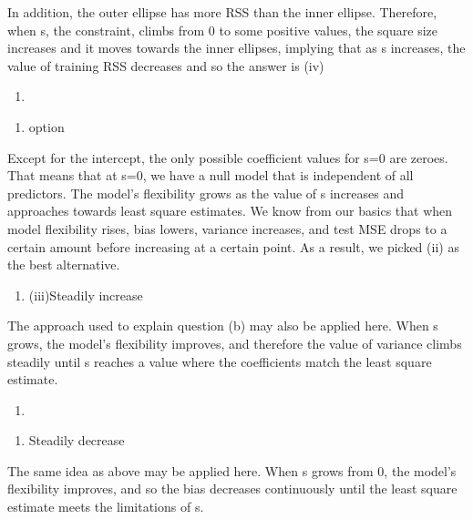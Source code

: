 \documentclass[
]{article}
\providecommand{\tightlist}{%
  \setlength{\itemsep}{0pt}\setlength{\parskip}{0pt}}
\begin{document}
In addition, the outer ellipse has more RSS than the inner ellipse.
Therefore, when s, the constraint, climbs from 0 to some positive
values, the square size increases and it moves towards the inner
ellipses, implying that as s increases, the value of training RSS
decreases and so the answer is (iv)

\begin{enumerate}
\def\labelenumi{\alph{enumi})}
\setcounter{enumi}{1}
\tightlist
\item
\end{enumerate}

\begin{enumerate}
\def\labelenumi{(\roman{enumi})}
\setcounter{enumi}{1}
\tightlist
\item
  option
\end{enumerate}

Except for the intercept, the only possible coefficient values for s=0
are zeroes. That means that at s=0, we have a null model that is
independent of all predictors. The model's flexibility grows as the
value of s increases and approaches towards least square estimates. We
know from our basics that when model flexibility rises, bias lowers,
variance increases, and test MSE drops to a certain amount before
increasing at a certain point. As a result, we picked (ii) as the best
alternative.

\begin{enumerate}
\def\labelenumi{\alph{enumi})}
\setcounter{enumi}{2}
\tightlist
\item
  (iii)Steadily increase
\end{enumerate}

The approach used to explain question (b) may also be applied here. When
s grows, the model's flexibility improves, and therefore the value of
variance climbs steadily until s reaches a value where the coefficients
match the least square estimate.

\begin{enumerate}
\def\labelenumi{\alph{enumi})}
\setcounter{enumi}{3}
\tightlist
\item
\end{enumerate}

\begin{enumerate}
\def\labelenumi{(\roman{enumi})}
\setcounter{enumi}{3}
\tightlist
\item
  Steadily decrease
\end{enumerate}

The same idea as above may be applied here. When s grows from 0, the
model's flexibility improves, and so the bias decreases continuously
until the least square estimate meets the limitations of s.
\end{document}
